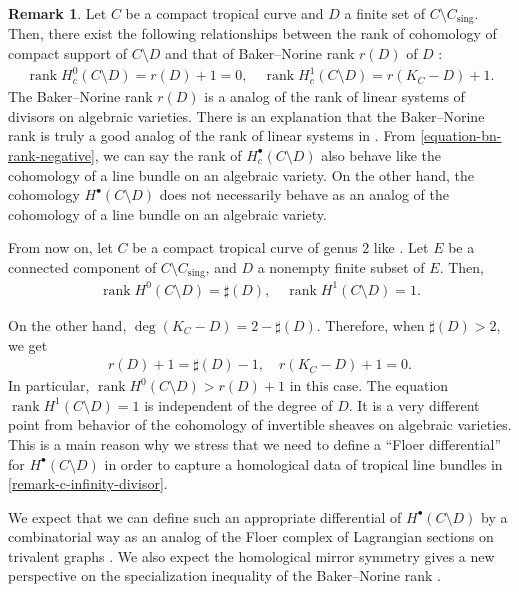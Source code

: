 \documentclass[a4paper,dvipdfmx,reqno,12pt]{amsart}
\theoremstyle{definition}
\newtheorem{remark}[theorem]{Remark}
\newcommand{\opn}[1]{\operatorname{#1}}
\numberwithin{equation}{section}
\begin{document}
\begin{remark}
\label{remark-complement-cohomology}
Let $C$ be a compact tropical curve and $D$
a finite set of $C\setminus C_{\mathrm{sing}}$.
Then, there exist the following relationships
between the rank of cohomology of compact support
of $C\setminus D$ and that of Baker--Norine rank
$r(D)$ of $D$ \cite[Definition 1.12]{MR2377750}: 
\begin{align}
\label{equation-bn-rank-negative}
\opn{rank} H_c^{0}(C\setminus D)=r(D)+1=0, \quad
\opn{rank} H_c^{1}(C\setminus D)=r(K_C-D)+1.
\end{align}
The Baker--Norine rank $r(D)$ is a analog of 
the rank of linear systems of divisors on
algebraic varieties.
There is an explanation that the Baker--Norine
rank is truly a good analog of the rank of linear systems
in \cite{MR2448666}.
From \eqref{equation-bn-rank-negative},
we can say the rank of $H_c^{\bullet}(C\setminus D)$
also behave like the cohomology of a line bundle on
an algebraic variety.
On the other hand, the cohomology
$H^{\bullet}(C\setminus D)$ does not necessarily behave
as an analog of the cohomology of a line bundle on
an algebraic variety.

From now on, let $C$ be a compact tropical curve
of genus $2$ like \cite[Figure 1]{MR2457739}.
Let $E$ be a connected component of  
 $C\setminus C_{\mathrm{sing}}$, and
$D$ a nonempty finite subset of $E$. 
Then,
\begin{align}
\label{equation-cohomology-behaviour}
\opn{rank} H^{0}(C\setminus D)=\sharp(D), \quad
\opn{rank} H^{1}(C\setminus D)=1.
\end{align}

On the other hand, $\opn{deg}(K_C-D)=2-\sharp (D)$.
Therefore, when $\sharp (D)>2$, we get
\begin{align}
\label{equation-rank-behaviour}
r(D)+1=\sharp(D)-1,\quad r(K_C-D)+1=0.
\end{align}
In particular, 
$\opn{rank} H^{0}(C\setminus D)>r(D)+1$ in this case.
The equation $\opn{rank} H^{1}(C\setminus D)=1$ is
independent of the degree of $D$.
It is a very different point from behavior of 
the cohomology of invertible sheaves on algebraic varieties.
This is a main reason why we stress 
that we need to define a ``Floer differential'' for 
$H^{\bullet}(C\setminus D)$ in order to capture a
homological data of tropical line bundles 
in \cref{remark-c-infinity-divisor}.

We expect that we can define such an appropriate
differential of $H^{\bullet}(C\setminus D)$
by a combinatorial way as an analog of
the Floer complex of Lagrangian sections on 
trivalent graphs
\cite{auroux2022lagrangian}.
We also expect the homological mirror symmetry
gives a new perspective on the specialization
inequality of the Baker--Norine rank 
\cite[Lemma 2.8]{MR2448666}. 
\end{remark}
\end{document}

